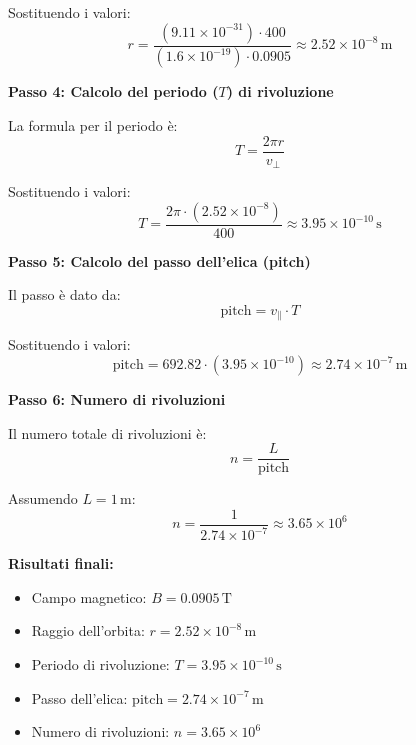 \documentclass{article}
\begin{document}
Sostituendo i valori:
\begin{equation}
r = \frac{(9.11 \times 10^{-31}) \cdot 400}{(1.6 \times 10^{-19}) \cdot 0.0905} \approx 2.52 \times 10^{-8} \, \text{m}
\end{equation}

\textbf{Passo 4: Calcolo del periodo (\(T\)) di rivoluzione}

La formula per il periodo è:
\begin{equation}
T = \frac{2 \pi r}{v_\perp}
\end{equation}

Sostituendo i valori:
\begin{equation}
T = \frac{2 \pi \cdot (2.52 \times 10^{-8})}{400} \approx 3.95 \times 10^{-10} \, \text{s}
\end{equation}

\textbf{Passo 5: Calcolo del passo dell'elica (pitch)}

Il passo è dato da:
\begin{equation}
\text{pitch} = v_\parallel \cdot T
\end{equation}

Sostituendo i valori:
\begin{equation}
\text{pitch} = 692.82 \cdot (3.95 \times 10^{-10}) \approx 2.74 \times 10^{-7} \, \text{m}
\end{equation}

\textbf{Passo 6: Numero di rivoluzioni}

Il numero totale di rivoluzioni è:
\begin{equation}
n = \frac{L}{\text{pitch}}
\end{equation}

Assumendo \(L = 1 \, \text{m}\):
\begin{equation}
n = \frac{1}{2.74 \times 10^{-7}} \approx 3.65 \times 10^6
\end{equation}

\textbf{Risultati finali:}
\begin{itemize}
    \item Campo magnetico: \(B = 0.0905 \, \text{T}\)
    \item Raggio dell'orbita: \(r = 2.52 \times 10^{-8} \, \text{m}\)
    \item Periodo di rivoluzione: \(T = 3.95 \times 10^{-10} \, \text{s}\)
    \item Passo dell'elica: \(\text{pitch} = 2.74 \times 10^{-7} \, \text{m}\)
    \item Numero di rivoluzioni: \(n = 3.65 \times 10^6\)
\end{itemize}
\end{document}
